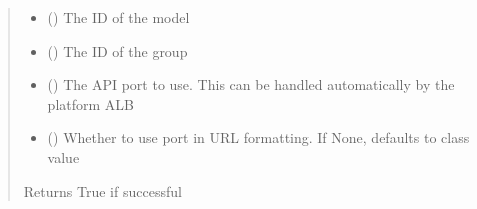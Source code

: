 \documentclass[letterpaper,10pt,english]{sphinxmanual}
\begin{document}
\begin{fulllineitems}
\begin{fulllineitems}
\begin{sphinxVerbatim}[commandchars=\\\{\}]
 
  
 
\end{sphinxVerbatim}
\begin{quote}\begin{description}
\begin{itemize}
\item {} 
\sphinxAtStartPar
{} () \textendash{} The ID of the model

\item {} 
\sphinxAtStartPar
{} () \textendash{} The ID of the group

\item {} 
\sphinxAtStartPar
{} (\sphinxstyleliteralemphasis{\sphinxupquote{ (}}\sphinxstyleliteralemphasis{\sphinxupquote{)}}) \textendash{} The API port to use. This can be handled automatically by the platform ALB

\item {} 
\sphinxAtStartPar
{} (\sphinxstyleliteralemphasis{\sphinxupquote{ (}}\sphinxstyleliteralemphasis{\sphinxupquote{)}}) \textendash{} Whether to use port in URL formatting. If None, defaults to class value

\end{itemize}

\sphinxAtStartPar
{} \textendash{} Returns True if successful


\end{description}
\end{quote}
\end{fulllineitems}
\end{fulllineitems}
\end{document}
